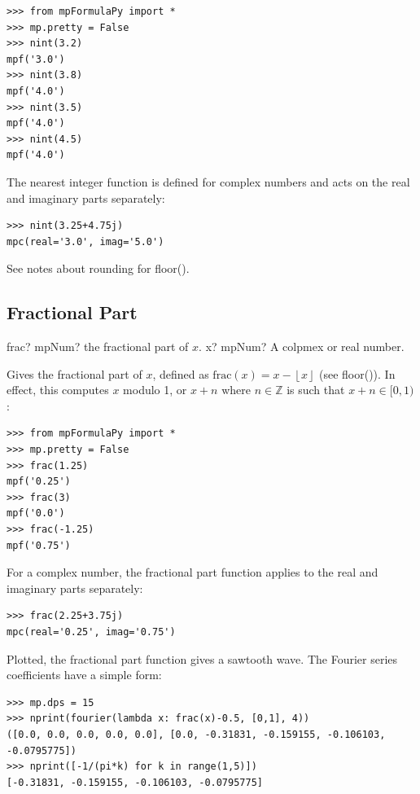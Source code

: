 \begin{lstlisting}
>>> from mpFormulaPy import *
>>> mp.pretty = False
>>> nint(3.2)
mpf('3.0')
>>> nint(3.8)
mpf('4.0')
>>> nint(3.5)
mpf('4.0')
>>> nint(4.5)
mpf('4.0')
\end{lstlisting}


The nearest integer function is defined for complex numbers and acts on the real and imaginary parts separately:

\begin{lstlisting}
>>> nint(3.25+4.75j)
mpc(real='3.0', imag='5.0')
\end{lstlisting}


See notes about rounding for floor().



\subsection{Fractional Part}

\begin{mpFunctionsExtract}
	\mpFunctionOne
	{frac? mpNum? the fractional part of $x$.}
	{x? mpNum? A colpmex or real number.}
\end{mpFunctionsExtract}


\vpara
Gives the fractional part of $x$, defined as $\text{frac}(x)=x-\left\lfloor x \right\rfloor$ (see floor()). In effect, this computes $x$ modulo 1, or $x+n$ where $n \in \mathbb{Z}$ is such that $x+n \in [0,1)$:

\begin{lstlisting}
>>> from mpFormulaPy import *
>>> mp.pretty = False
>>> frac(1.25)
mpf('0.25')
>>> frac(3)
mpf('0.0')
>>> frac(-1.25)
mpf('0.75')
\end{lstlisting}


For a complex number, the fractional part function applies to the real and imaginary parts separately:

\begin{lstlisting}
>>> frac(2.25+3.75j)
mpc(real='0.25', imag='0.75')
\end{lstlisting}


Plotted, the fractional part function gives a sawtooth wave. The Fourier series coefficients have a simple form:

\begin{lstlisting}
>>> mp.dps = 15
>>> nprint(fourier(lambda x: frac(x)-0.5, [0,1], 4))
([0.0, 0.0, 0.0, 0.0, 0.0], [0.0, -0.31831, -0.159155, -0.106103, -0.0795775])
>>> nprint([-1/(pi*k) for k in range(1,5)])
[-0.31831, -0.159155, -0.106103, -0.0795775]
\end{lstlisting}



